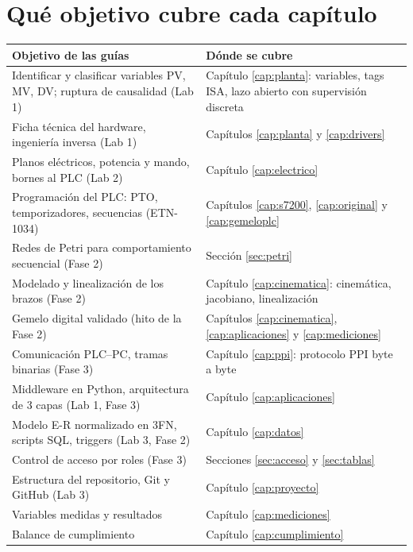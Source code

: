 \section{Qué objetivo cubre cada capítulo}
\begin{center}\small
\begin{longtable}{>{\raggedright}p{6.6cm} >{\raggedright\arraybackslash}p{8.6cm}}
\toprule
\textbf{Objetivo de las guías} & \textbf{Dónde se cubre}\\
\midrule
\endhead
Identificar y clasificar variables PV, MV, DV; ruptura de causalidad (Lab 1) & Capítulo \ref{cap:planta}: variables, tags ISA, lazo abierto con supervisión discreta\\
Ficha técnica del hardware, ingeniería inversa (Lab 1) & Capítulos \ref{cap:planta} y \ref{cap:drivers}\\
Planos eléctricos, potencia y mando, bornes al PLC (Lab 2) & Capítulo \ref{cap:electrico}\\
Programación del PLC: PTO, temporizadores, secuencias (ETN-1034) & Capítulos \ref{cap:s7200}, \ref{cap:original} y \ref{cap:gemeloplc}\\
Redes de Petri para comportamiento secuencial (Fase 2) & Sección \ref{sec:petri}\\
Modelado y linealización de los brazos (Fase 2) & Capítulo \ref{cap:cinematica}: cinemática, jacobiano, linealización\\
Gemelo digital validado (hito de la Fase 2) & Capítulos \ref{cap:cinematica}, \ref{cap:aplicaciones} y \ref{cap:mediciones}\\
Comunicación PLC--PC, tramas binarias (Fase 3) & Capítulo \ref{cap:ppi}: protocolo PPI byte a byte\\
Middleware en Python, arquitectura de 3 capas (Lab 1, Fase 3) & Capítulo \ref{cap:aplicaciones}\\
Modelo E-R normalizado en 3FN, scripts SQL, triggers (Lab 3, Fase 2) & Capítulo \ref{cap:datos}\\
Control de acceso por roles (Fase 3) & Secciones \ref{sec:acceso} y \ref{sec:tablas}\\
Estructura del repositorio, Git y GitHub (Lab 3) & Capítulo \ref{cap:proyecto}\\
Variables medidas y resultados & Capítulo \ref{cap:mediciones}\\
Balance de cumplimiento & Capítulo \ref{cap:cumplimiento}\\
\bottomrule
\end{longtable}
\end{center}

